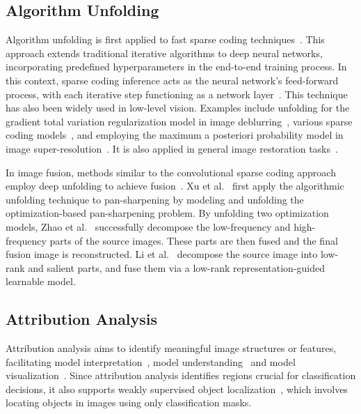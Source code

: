 \subsection{Algorithm Unfolding}

Algorithm unfolding is first applied to fast sparse coding techniques~\cite{DBLP:conf/icml/GregorL10}. This approach extends traditional iterative algorithms to deep neural networks, incorporating predefined hyperparameters in the end-to-end training process.
In this context, sparse coding inference acts as the neural network's feed-forward process, with each iterative step functioning as a network layer~\cite{DBLP:conf/cvpr/ZhaoZXLP22}.
This technique has also been widely used in low-level vision. Examples include unfolding for the gradient total variation regularization model in image deblurring~\cite{DBLP:journals/tci/LiTGME20}, various sparse coding models~\cite{deng2019deep,DBLP:journals/tip/MarivaniTCD20}, and employing the maximum a posteriori probability model in image super-resolution~\cite{yang2022memory,DBLP:conf/cvpr/ZhangGT20}. It is also applied in general image restoration tasks~\cite{DBLP:conf/cvpr/ZhangZGZ17,DBLP:journals/pami/DongWYSWL19,DBLP:conf/iccv/LiuPRS19,DBLP:journals/ijcv/ZhouYPRXC23}.

In image fusion, methods similar to the convolutional sparse coding approach employ deep unfolding to achieve fusion~\cite{DBLP:journals/pami/0002D21,DBLP:journals/corr/abs-2005-08448}. Xu et al.~\cite{DBLP:conf/cvpr/Xu0ZSL021} first apply the algorithmic unfolding technique to pan-sharpening by modeling and unfolding the optimization-based pan-sharpening problem. By unfolding two optimization models, Zhao et al.~\cite{DBLP:journals/tcsv/ZhaoXZLZL22} successfully decompose the low-frequency and high-frequency parts of the source images. These parts are then fused and the final fusion image is reconstructed. Li et al.~\cite{li2023lrrnet} decompose the source image into low-rank and salient parts, and fuse them via a low-rank representation-guided learnable model.

\subsection{Attribution Analysis}
Attribution analysis aims to identify meaningful image structures or features, facilitating model interpretation~\cite{DBLP:conf/cvpr/ShenGTZ20}, model understanding~\cite{DBLP:conf/iclr/BauZSZTFT19} and model visualization~\cite{DBLP:journals/corr/SimonyanVZ13,DBLP:journals/corr/SpringenbergDBR14,DBLP:conf/eccv/ZeilerF14}. 
Since attribution analysis identifies regions crucial for classification decisions, it also supports weakly supervised object localization~\cite{DBLP:conf/cvpr/ZhouKLOT16,DBLP:conf/iccv/SelvarajuCDVPB17,DBLP:journals/corr/abs-1805-11393}, which involves locating objects in images using only classification masks.


